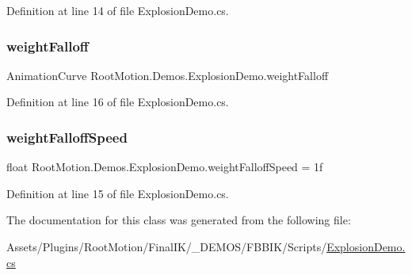 Definition at line 14 of file Explosion\+Demo.\+cs.

\mbox{\label{class_root_motion_1_1_demos_1_1_explosion_demo_a2a44c8e9f67d3d2d2c7f681118078ea6}} 
\subsubsection{\texorpdfstring{weight\+Falloff}{weightFalloff}}
{\footnotesize\ttfamily Animation\+Curve Root\+Motion.\+Demos.\+Explosion\+Demo.\+weight\+Falloff}



Definition at line 16 of file Explosion\+Demo.\+cs.

\mbox{\label{class_root_motion_1_1_demos_1_1_explosion_demo_a5caba78bb333e642f9607fb82d10b1af}} 
\subsubsection{\texorpdfstring{weight\+Falloff\+Speed}{weightFalloffSpeed}}
{\footnotesize\ttfamily float Root\+Motion.\+Demos.\+Explosion\+Demo.\+weight\+Falloff\+Speed = 1f}



Definition at line 15 of file Explosion\+Demo.\+cs.



The documentation for this class was generated from the following file\+:\begin{DoxyCompactItemize}
\item 
Assets/\+Plugins/\+Root\+Motion/\+Final\+I\+K/\+\_\+\+D\+E\+M\+O\+S/\+F\+B\+B\+I\+K/\+Scripts/\mbox{\hyperlink{_explosion_demo_8cs}{Explosion\+Demo.\+cs}}\end{DoxyCompactItemize}
